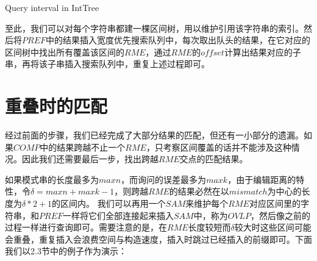 ﻿\documentclass{sysuthesis}
\begin{document}
\begin{algorithm}[H]
	\caption{Query interval in IntTree}\label{algo:intquery}
\end{algorithm}

至此，我们可以对每个字符串都建一棵区间树，用以维护引用该字符串的索引。然后将$PREF$中的结果插入宽度优先搜索队列中，每次取出队头的结果，在它对应的区间树中找出所有覆盖该区间的$RME$，通过$RME$的$offset$计算出结果对应的子串，再将该子串插入搜索队列中，重复上述过程即可。



\section{重叠时的匹配}
经过前面的步骤，我们已经完成了大部分结果的匹配，但还有一小部分的遗漏。如果$COMP$中的结果跨越不止一个$RME$，只考察区间覆盖的话并不能涉及这种情况。因此我们还需要最后一步，找出跨越$RME$交点的匹配结果。\par
如果模式串的长度最多为$maxn$，而询问的误差最多为$maxk$，由于编辑距离的特性，令$\delta = maxn + maxk - 1$，则跨越$RME$的结果必然在以$mismatch$为中心的长度为$\delta * 2 + 1$的区间内。
我们可以再用一个$SAM$来维护每个$RME$对应区间里的字符串，和$PREF$一样将它们全部连接起来插入$SAM$中，称为$OVLP$，然后像之前的过程一样进行查询即可。需要注意的是，在$RME$长度较短而$\delta$较大时这些区间可能会重叠，重复插入会浪费空间与构造速度，插入时跳过已经插入的前缀即可。下面我们以2.3节中的例子作为演示：\par
\end{document}
